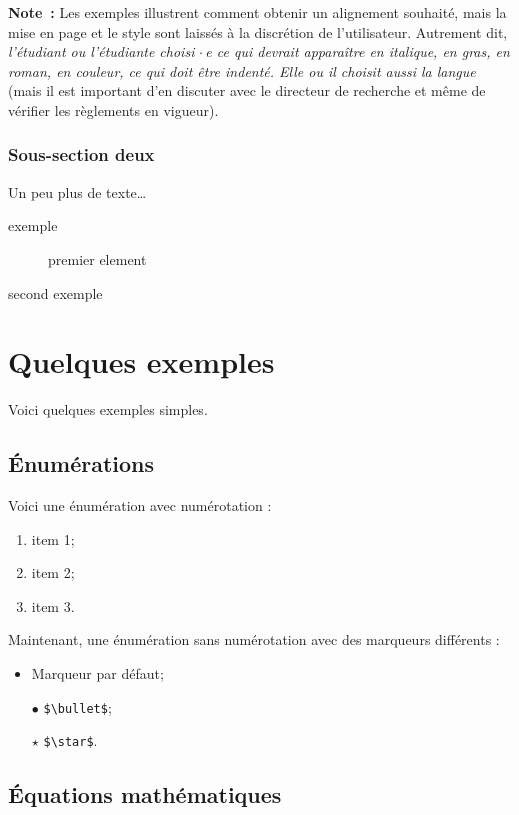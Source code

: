 \documentclass[12pt,twoside,maitrise]{dms}
\theoremstyle{definition}
\numberwithin{equation}{section}
\numberwithin{table}{chapter}
\numberwithin{figure}{chapter}
\begin{document}
\noindent\textbf{Note~:} Les exemples illustrent comment
obtenir un alignement souhaité, mais la mise en page
et le style sont laissés à la discrétion de l'utilisateur.
Autrement dit, {\it l'étudiant ou l'étudiante choisi$\,\cdot$e
		ce qui devrait apparaître en italique, en gras, en roman,
		en couleur, ce qui doit être indenté. Elle ou il choisit aussi la
		langue\/} (mais il est important d'en discuter avec le directeur de recherche
et même de vérifier les règlements en vigueur).

\subsection{Sous-section deux}

Un peu plus de texte\dots

\begin{description}
	\item [exemple] premier element
	\item [second exemple]
\end{description}

\chapter{Quelques exemples}

Voici quelques exemples simples.

\section{Énumérations}

Voici une énumération avec numérotation :
\begin{enumerate}
	\item item 1;
	\item item 2;
	\item item 3.
\end{enumerate}
Maintenant, une énumération sans numérotation avec des marqueurs différents :
\begin{itemize}
	\item Marqueur par défaut;
	\item[$\bullet$] \verb|$\bullet$|;
	\item[$\star$] \verb|$\star$|.
\end{itemize}

\section{Équations mathématiques}
\end{document}
